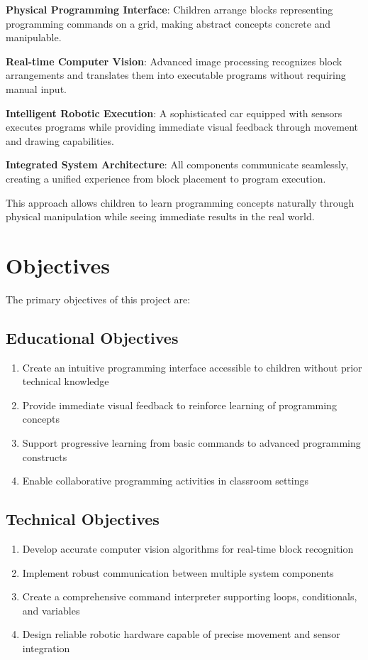 \textbf{Physical Programming Interface}: Children arrange blocks representing programming commands on a grid, making abstract concepts concrete and manipulable.

\textbf{Real-time Computer Vision}: Advanced image processing recognizes block arrangements and translates them into executable programs without requiring manual input.

\textbf{Intelligent Robotic Execution}: A sophisticated car equipped with sensors executes programs while providing immediate visual feedback through movement and drawing capabilities.

\textbf{Integrated System Architecture}: All components communicate seamlessly, creating a unified experience from block placement to program execution.

This approach allows children to learn programming concepts naturally through physical manipulation while seeing immediate results in the real world.

\section{Objectives}

The primary objectives of this project are:

\subsection{Educational Objectives}
\begin{enumerate}
    \item Create an intuitive programming interface accessible to children without prior technical knowledge
    \item Provide immediate visual feedback to reinforce learning of programming concepts
    \item Support progressive learning from basic commands to advanced programming constructs
    \item Enable collaborative programming activities in classroom settings
\end{enumerate}

\subsection{Technical Objectives}
\begin{enumerate}
    \item Develop accurate computer vision algorithms for real-time block recognition
    \item Implement robust communication between multiple system components
    \item Create a comprehensive command interpreter supporting loops, conditionals, and variables
    \item Design reliable robotic hardware capable of precise movement and sensor integration
\end{enumerate}

